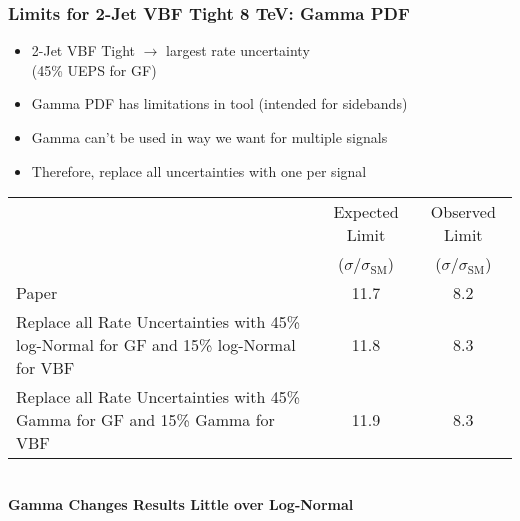 \documentclass{beamer}
\newcommand{\jra}{\ensuremath{\rightarrow}}
\begin{document}
\begin{frame}
\frametitle{Limits for 2-Jet VBF Tight 8 TeV: Gamma PDF}
\begin{itemize}
  \item 2-Jet VBF Tight \jra{} largest rate uncertainty \\ (45\% UEPS for GF)
  \item Gamma PDF has limitations in tool (intended for sidebands)
  \item Gamma can't be used in way we want for multiple signals
  \item Therefore, replace all uncertainties with one per signal
\end{itemize}
\begin{center}
\scriptsize
\begin{tabular}{ | p{4cm} | c | c | }
\hline
 & Expected Limit  & Observed Limit\\
 & ($\sigma/\sigma_\mathrm{SM}$) & ($\sigma/\sigma_\mathrm{SM}$) \\ \hline \hline
Paper & 11.7 & 8.2 \\ \hline
Replace all Rate Uncertainties with 45\% log-Normal for GF and 15\% log-Normal for VBF & 11.8 & 8.3 \\ \hline
Replace all Rate Uncertainties with 45\% Gamma for GF and 15\% Gamma for VBF & 11.9 & 8.3 \\ \hline
\end{tabular}
\\ \normalsize
\vspace{1ex}
\bf Gamma Changes Results Little over Log-Normal
\end{center}
\end{frame}
\end{document}
